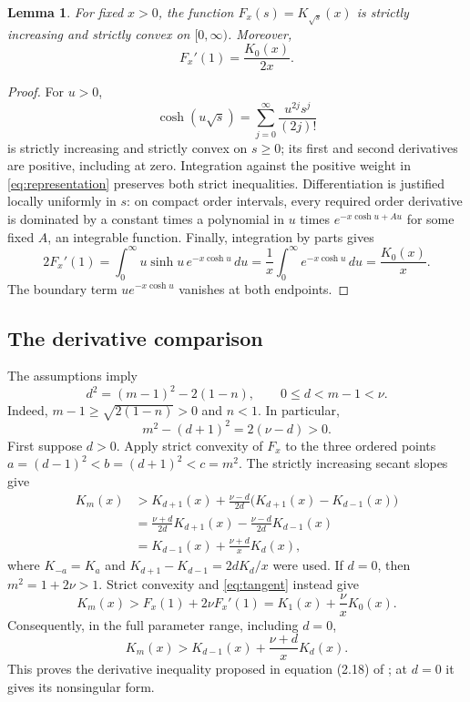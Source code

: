 \documentclass[11pt]{article}
\newtheorem{lemma}[theorem]{Lemma}
\begin{document}
\begin{lemma}\label{lem:convex}
For fixed $x>0$, the function $F_x(s)=K_{\sqrt{s}}(x)$ is strictly
increasing and strictly convex on $[0,\infty)$. Moreover,
\begin{equation}\label{eq:tangent}
 F_x'(1)=\frac{K_0(x)}{2x}.
\end{equation}
\end{lemma}
\begin{proof}
For $u>0$,
\[
 \cosh(u\sqrt{s})=\sum_{j=0}^\infty\frac{u^{2j}s^j}{(2j)!}
\]
is strictly increasing and strictly convex on $s\geq0$; its first and
second derivatives are positive, including at zero. Integration against
the positive weight in \eqref{eq:representation} preserves both strict
inequalities. Differentiation is justified locally uniformly in $s$:
on compact order intervals, every required order derivative is dominated
by a constant times a polynomial in $u$ times
$e^{-x\cosh u+A u}$ for some fixed $A$, an integrable function.
Finally, integration by parts gives
\[
 2F_x'(1)=\int_0^\infty u\sinh u\,e^{-x\cosh u}\,du
 =\frac1x\int_0^\infty e^{-x\cosh u}\,du=\frac{K_0(x)}x.
\]
The boundary term $u e^{-x\cosh u}$ vanishes at both endpoints.
\end{proof}

\subsection*{The derivative comparison}
The assumptions imply
\begin{equation}\label{eq:domain}
 d^2=(m-1)^2-2(1-n),\qquad 0\leq d<m-1<\nu.
\end{equation}
Indeed, $m-1\geq\sqrt{2(1-n)}>0$ and $n<1$.
In particular,
\[
 m^2-(d+1)^2=2(\nu-d)>0.
\]
First suppose $d>0$. Apply strict convexity of $F_x$ to the three ordered
points $a=(d-1)^2<b=(d+1)^2<c=m^2$. The strictly increasing secant slopes give
\begin{align*}
 K_m(x)
 &>K_{d+1}(x)+\frac{\nu-d}{2d}
             \bigl(K_{d+1}(x)-K_{d-1}(x)\bigr)\\
 &=\frac{\nu+d}{2d}K_{d+1}(x)
    -\frac{\nu-d}{2d}K_{d-1}(x)\\
 &=K_{d-1}(x)+\frac{\nu+d}{x}K_d(x),
\end{align*}
where $K_{-a}=K_a$ and
$K_{d+1}-K_{d-1}=2dK_d/x$ were used.
If $d=0$, then $m^2=1+2\nu>1$. Strict convexity and
\eqref{eq:tangent} instead give
\[
 K_m(x)>F_x(1)+2\nu F_x'(1)
       =K_1(x)+\frac\nu x K_0(x).
\]
Consequently, in the full parameter range, including $d=0$,
\begin{equation}\label{eq:comparison}
 K_m(x)>K_{d-1}(x)+\frac{\nu+d}{x}K_d(x).
\end{equation}
This proves the derivative inequality proposed in equation (2.18) of
\cite{gaunt}; at $d=0$ it gives its nonsingular form.
\end{document}
